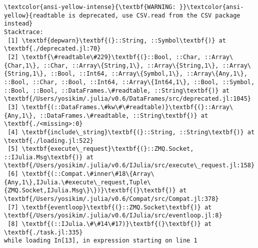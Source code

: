 \documentclass[11pt]{article}
\begin{document}
    \begin{Verbatim}[commandchars=\\\{\}]
\textcolor{ansi-yellow-intense}{\textbf{WARNING: }}\textcolor{ansi-yellow}{readtable is deprecated, use CSV.read from the CSV package instead}
Stacktrace:
 [1] \textbf{depwarn}\textbf{(}::String, ::Symbol\textbf{)} at \textbf{./deprecated.jl:70}
 [2] \textbf{\#readtable\#229}\textbf{(}::Bool, ::Char, ::Array\{Char,1\}, ::Char, ::Array\{String,1\}, ::Array\{String,1\}, ::Array\{String,1\}, ::Bool, ::Int64, ::Array\{Symbol,1\}, ::Array\{Any,1\}, ::Bool, ::Char, ::Bool, ::Int64, ::Array\{Int64,1\}, ::Bool, ::Symbol, ::Bool, ::Bool, ::DataFrames.\#readtable, ::String\textbf{)} at \textbf{/Users/yosikim/.julia/v0.6/DataFrames/src/deprecated.jl:1045}
 [3] \textbf{(::DataFrames.\#kw\#\#readtable)}\textbf{(}::Array\{Any,1\}, ::DataFrames.\#readtable, ::String\textbf{)} at \textbf{./<missing>:0}
 [4] \textbf{include\_string}\textbf{(}::String, ::String\textbf{)} at \textbf{./loading.jl:522}
 [5] \textbf{execute\_request}\textbf{(}::ZMQ.Socket, ::IJulia.Msg\textbf{)} at \textbf{/Users/yosikim/.julia/v0.6/IJulia/src/execute\_request.jl:158}
 [6] \textbf{(::Compat.\#inner\#18\{Array\{Any,1\},IJulia.\#execute\_request,Tuple\{ZMQ.Socket,IJulia.Msg\}\})}\textbf{(}\textbf{)} at \textbf{/Users/yosikim/.julia/v0.6/Compat/src/Compat.jl:378}
 [7] \textbf{eventloop}\textbf{(}::ZMQ.Socket\textbf{)} at \textbf{/Users/yosikim/.julia/v0.6/IJulia/src/eventloop.jl:8}
 [8] \textbf{(::IJulia.\#\#14\#17)}\textbf{(}\textbf{)} at \textbf{./task.jl:335}
while loading In[13], in expression starting on line 1

    \end{Verbatim}
\end{document}
